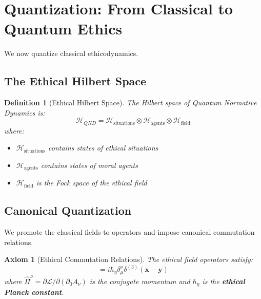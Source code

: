 \documentclass[12pt]{article}
\newtheorem{definition}{Definition}[section]
\newtheorem{axiom}{Axiom}
\begin{document}
\section{Quantization: From Classical to Quantum Ethics}

We now quantize classical ethicodynamics.

\subsection{The Ethical Hilbert Space}

\begin{definition}[Ethical Hilbert Space]
The Hilbert space of Quantum Normative Dynamics is:
\begin{equation}
    \mathcal{H}_{QND} = \mathcal{H}_{\text{situations}} \otimes \mathcal{H}_{\text{agents}} \otimes \mathcal{H}_{\text{field}}
\end{equation}
where:
\begin{itemize}
    \item $\mathcal{H}_{\text{situations}}$ contains states of ethical situations
    \item $\mathcal{H}_{\text{agents}}$ contains states of moral agents
    \item $\mathcal{H}_{\text{field}}$ is the Fock space of the ethical field
\end{itemize}
\end{definition}

\subsection{Canonical Quantization}

We promote the classical fields to operators and impose canonical commutation relations.

\begin{axiom}[Ethical Commutation Relations]
The ethical field operators satisfy:
\begin{equation}
    [\hat{A}_\mu(x), \hat{\Pi}^\nu(y)] = i\hbar_\eta \delta_\mu^\nu \delta^{(3)}(\mathbf{x} - \mathbf{y})
\end{equation}
where $\hat{\Pi}^\nu = \partial\mathcal{L}/\partial(\partial_0 A_\nu)$ is the conjugate momentum and $\hbar_\eta$ is the \textbf{ethical Planck constant}.
\end{axiom}
\end{document}
